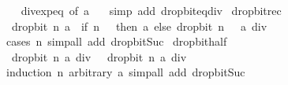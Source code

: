 \begin{isabellebody}
%
\isadelimproof
\ \ %
\endisadelimproof
%
\isatagproof
{}\isamarkupfalse%
\ div{\isacharunderscore}{\kern0pt}exp{\isacharunderscore}{\kern0pt}eq\ {\isacharbrackleft}{\kern0pt}of\ a\ {}{\isacharbrackright}{\kern0pt}\ \isamarkupfalse%
\ {\isacharparenleft}{\kern0pt}simp\ add{\isacharcolon}{\kern0pt}\ drop{\isacharunderscore}{\kern0pt}bit{\isacharunderscore}{\kern0pt}eq{\isacharunderscore}{\kern0pt}div{\isacharparenright}{\kern0pt}%
\endisatagproof
{\isafoldproof}%
%
\isadelimproof
\isanewline
%
\endisadelimproof
\isanewline
{}\isamarkupfalse%
\ drop{\isacharunderscore}{\kern0pt}bit{\isacharunderscore}{\kern0pt}rec{\isacharcolon}{\kern0pt}\isanewline
\ \ {\isachardoublequoteopen}drop{\isacharunderscore}{\kern0pt}bit\ n\ a\ {\isacharequal}{\kern0pt}\ {\isacharparenleft}{\kern0pt}if\ n\ {\isacharequal}{\kern0pt}\ {}\ then\ a\ else\ drop{\isacharunderscore}{\kern0pt}bit\ {\isacharparenleft}{\kern0pt}n\ {\isacharminus}{\kern0pt}\ {}{\isacharparenright}{\kern0pt}\ {\isacharparenleft}{\kern0pt}a\ div\ {}{\isacharparenright}{\kern0pt}{\isacharparenright}{\kern0pt}{\isachardoublequoteclose}\isanewline
%
\isadelimproof
\ \ %
\endisadelimproof
%
\isatagproof
{}\isamarkupfalse%
\ {\isacharparenleft}{\kern0pt}cases\ n{\isacharparenright}{\kern0pt}\ {\isacharparenleft}{\kern0pt}simp{\isacharunderscore}{\kern0pt}all\ add{\isacharcolon}{\kern0pt}\ drop{\isacharunderscore}{\kern0pt}bit{\isacharunderscore}{\kern0pt}Suc{\isacharparenright}{\kern0pt}%
\endisatagproof
{\isafoldproof}%
%
\isadelimproof
\isanewline
%
\endisadelimproof
\isanewline
{}\isamarkupfalse%
\ drop{\isacharunderscore}{\kern0pt}bit{\isacharunderscore}{\kern0pt}half{\isacharcolon}{\kern0pt}\isanewline
\ \ {\isachardoublequoteopen}drop{\isacharunderscore}{\kern0pt}bit\ n\ {\isacharparenleft}{\kern0pt}a\ div\ {}{\isacharparenright}{\kern0pt}\ {\isacharequal}{\kern0pt}\ drop{\isacharunderscore}{\kern0pt}bit\ n\ a\ div\ {}{\isachardoublequoteclose}\isanewline
%
\isadelimproof
\ \ %
\endisadelimproof
%
\isatagproof
{}\isamarkupfalse%
\ {\isacharparenleft}{\kern0pt}induction\ n\ arbitrary{\isacharcolon}{\kern0pt}\ a{\isacharparenright}{\kern0pt}\ {\isacharparenleft}{\kern0pt}simp{\isacharunderscore}{\kern0pt}all\ add{\isacharcolon}{\kern0pt}\ drop{\isacharunderscore}{\kern0pt}bit{\isacharunderscore}{\kern0pt}Suc{\isacharparenright}{\kern0pt}%
\endisatagproof
{\isafoldproof}%
%
\isadelimproof
\isanewline
%
\endisadelimproof
\isanewline
{}\isamarkupfalse%

\end{isabellebody}
